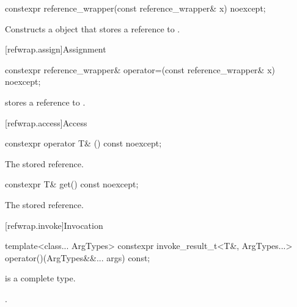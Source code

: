 %
\begin{itemdecl}
constexpr reference_wrapper(const reference_wrapper& x) noexcept;
\end{itemdecl}

\begin{itemdescr}
\pnum
\effects
Constructs a  object that
stores a reference to .
\end{itemdescr}

[refwrap.assign]{Assignment}

%
\begin{itemdecl}
constexpr reference_wrapper& operator=(const reference_wrapper& x) noexcept;
\end{itemdecl}

\begin{itemdescr}
\pnum
\ensures
{} stores a reference to  .
\end{itemdescr}

[refwrap.access]{Access}

%
\begin{itemdecl}
constexpr operator T& () const noexcept;
\end{itemdecl}

\begin{itemdescr}
\pnum
\returns
The stored reference.
\end{itemdescr}

%
\begin{itemdecl}
constexpr T& get() const noexcept;
\end{itemdecl}

\begin{itemdescr}
\pnum
\returns
The stored reference.
\end{itemdescr}

[refwrap.invoke]{Invocation}

%
\begin{itemdecl}
template<class... ArgTypes>
  constexpr invoke_result_t<T&, ArgTypes...>
    operator()(ArgTypes&&... args) const;
\end{itemdecl}

\begin{itemdescr}
\pnum
\mandates
{} is a complete type.

\pnum
\returns
{}.
\end{itemdescr}


